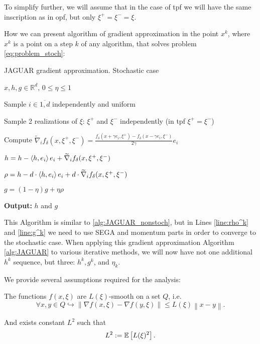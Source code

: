         To simplify further, we will assume that in the case of tpf we will have the same inscription as in opf, but only $\xi^+ = \xi^- = \xi$.
    
        How we can present algorithm of gradient approximation in the point $x^k$, where $x^k$ is a point on a step $k$ of any algorithm, that solves problem \eqref{eq:problem_stoch}:
    
        \begin{algorithm}[H]
    	\caption{JAGUAR gradient approximation. Stochastic case}
    	\label{alg:JAGUAR}
        	\begin{algorithmic}[1]
        		 $x, h, g \in \mathbb{R}^d$, $0 \leq \eta \leq 1$

                \State Sample $i \in \overline{1, d}$ independently and uniform
          
                \State Sample 2 realizations of $\xi$: $\xi^+$ and $\xi^-$ independently (in tpf $\xi^+= \xi^-$)

                \State Compute $\widetilde{\nabla}_i f_{\delta}(x, \xi^+, \xi^-) = \frac{f_{\delta}(x + \gamma e_i, \xi^+) - f_{\delta}(x - \gamma e_i, \xi^-)}{2 \gamma} e_i$

                \State $h = h - \left\langle h,e_i \right\rangle e_i + \widetilde{\nabla}_i f_{\delta}(x, \xi^+, \xi^-)$ \label{line:h^k}

                \State $\rho = h - d \cdot \left\langle h,e_i \right\rangle e_i + d \cdot \widetilde{\nabla}_i f_{\delta}(x, \xi^+, \xi^-)$ \label{line:rho^k}

                \State $g = (1 - \eta) g + \eta \rho$ \label{line:g^k}
    
                \State \textbf{Output:} $h$ and $g$ 
        	\end{algorithmic}
        \end{algorithm}
    
        This Algorithm is similar to \ref{alg:JAGUAR_nonstoch}, but in Lines \ref{line:rho^k} and \ref{line:g^k} we need to use SEGA and  momentum parts in order to converge to the stochastic case. When applying this gradient approximation Algorithm \ref{alg:JAGUAR} to various iterative methods, we will now have not one additional $h^k$ sequence, but three: $h^k, g^k$, and $\eta_k$.
    
        We provide several assumptions required for the analysis:
    
        \begin{assumption}[Smoothness]\label{ass:smooth}
            The functions $f(x, \xi)$ are $L(\xi)$-smooth on a set $Q$, i.e. 
            \begin{equation*}
                \forall x, y \in Q \hookrightarrow \left\|\nabla f(x, \xi) - \nabla f(y, \xi)\right\| \leq L(\xi) \left\|x-y\right\|.
            \end{equation*}
    
            And exists constant $L^2$ such that 
            \begin{equation*}
                L^2 := \mathbb{E}\left[ L(\xi)^2 \right].
            \end{equation*}
        \end{assumption}
    
